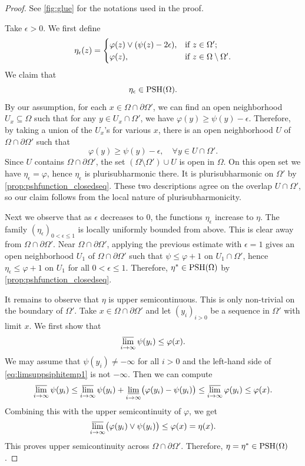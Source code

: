 \begin{proof}
See \cref{fig:glue} for the notations used in the proof.

    Take $\epsilon>0$.
    We first define
    \[
    \eta_{\epsilon}(z)=\begin{cases}
        \varphi(z)\lor (\psi(z)-2\epsilon),& \textup{if }z\in \Omega';\\
        \varphi(z),& \textup{if }z\in \Omega\setminus\Omega'.
    \end{cases}
    \]
    We claim that
    \[
    \eta_{\epsilon}\in \mathrm{PSH}(\Omega).
    \]
    By our assumption, for each $x\in \Omega\cap \partial \Omega'$, we can find an open neighborhood $U_x\subseteq \Omega$ such that for any $y\in U_x\cap \Omega'$, we have $\varphi(y)\geq \psi(y)-\epsilon$.
    Therefore, by taking a union of the $U_x$'s for various $x$, there is an open neighborhood $U$ of $\Omega\cap \partial \Omega'$ such that
    \[
    \varphi(y)\geq \psi(y)-\epsilon,\quad \forall y\in U\cap \Omega'.
    \]
    Since $U$ contains $\Omega\cap\partial\Omega'$, the set $(\Omega\setminus \Omega')\cup U$ is open in $\Omega$. On this open set we have $\eta_{\epsilon}=\varphi$, hence $\eta_{\epsilon}$ is plurisubharmonic there. It is plurisubharmonic on $\Omega'$ by \cref{prop:pshfunction_closedseq}. These two descriptions agree on the overlap $U\cap\Omega'$, so our claim follows from the local nature of plurisubharmonicity.

    Next we observe that as $\epsilon$ decreases to $0$, the functions $\eta_{\epsilon}$ increase to $\eta$. The family $(\eta_\epsilon)_{0<\epsilon\leq 1}$ is locally uniformly bounded from above. This is clear away from $\Omega\cap\partial\Omega'$. Near $\Omega\cap\partial\Omega'$, applying the previous estimate with $\epsilon=1$ gives an open neighborhood $U_1$ of $\Omega\cap\partial\Omega'$ such that $\psi\leq \varphi+1$ on $U_1\cap\Omega'$, hence $\eta_\epsilon\leq \varphi+1$ on $U_1$ for all $0<\epsilon\leq 1$. Therefore, $\eta^*\in \mathrm{PSH}(\Omega)$ by \cref{prop:pshfunction_closedseq}.

    It remains to observe that $\eta$ is upper semicontinuous. This is only non-trivial on the boundary of $\Omega'$. Take $x\in \Omega\cap \partial \Omega'$ and let $(y_i)_{i>0}$ be a sequence in $\Omega'$ with limit $x$. We first show that
    \begin{equation}\label{eq:limsuppsiphitemp1}
    \varlimsup_{i\to\infty} \psi(y_i)\leq \varphi(x).
    \end{equation}
    We may assume that $\psi(y_i)\neq -\infty$ for all $i>0$ and the left-hand side of \eqref{eq:limsuppsiphitemp1} is not $-\infty$. Then we can compute
    \[
    \varlimsup_{i\to\infty} \psi(y_i)\leq \varlimsup_{i\to\infty} \psi(y_i)+\varliminf_{i\to\infty} \bigl(\varphi(y_i)-\psi(y_i)\bigr)\leq \varlimsup_{i\to\infty}\varphi(y_i)\leq \varphi(x).
    \]
    Combining this with the upper semicontinuity of $\varphi$, we get
    \[
        \varlimsup_{i\to\infty}\bigl(\varphi(y_i)\lor\psi(y_i)\bigr)\leq \varphi(x)=\eta(x).
    \]
    This proves upper semicontinuity across $\Omega\cap\partial\Omega'$.
    Therefore, $\eta=\eta^*\in \mathrm{PSH}(\Omega)$.
\end{proof}

